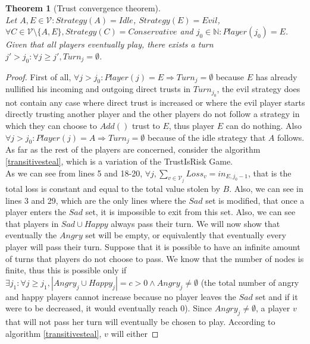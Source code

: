 \documentclass[11pt]{article}
\newtheorem{theorem}{Theorem}[section]
\theoremstyle{definition}
\theoremstyle{corollary}
\theoremstyle{lemma}
\begin{document}
    \begin{theorem}[Trust convergence theorem] \ \\
    \label{convergence}
       Let $A,E \in \mathcal{V} : Strategy(A) = Idle$, $Strategy(E) = Evil$, $\forall C \in \mathcal{V} \setminus \{A,E\},
       Strategy(C) = Conservative$ and $j_0 \in \mathbb{N} : Player(j_0) = E$. Given that all players eventually play, there
       exists a turn $j' > j_0 : \forall j \geq j', Turn_j = \emptyset$.
    \end{theorem}
    \begin{proof}
       First of all, $\forall j > j_0 : Player(j) = E \Rightarrow Turn_j = \emptyset$ because $E$ has already nullified his
       incoming and outgoing direct trusts in $Turn_{j_0}$, the evil strategy does not contain any case where direct trust is
       increased or where the evil player starts directly trusting another player and the other players do not follow a
       strategy in which they can choose to $Add()$ trust to $E$, thus player $E$ can do nothing. Also $\forall j > j_0 :
       Player(j) = A \Rightarrow Turn_j = \emptyset$ because of the idle strategy that $A$ follows. As far as the
       rest of the players are concerned, consider the algorithm \ref{transitivesteal}, which is a variation of the
       TrustIsRisk Game. \\
       As we can see from lines 5 and 18-20, $\forall j, \sum\limits_{v \in \mathcal{V}_j}Loss_v = in_{E, j_0-1}$, that is
       the total loss is constant and equal to the total value stolen by $B$. Also, we can see in lines 3 and 29, which are
       the only lines where the $Sad$ set is modified, that once a player enters the $Sad$ set, it is impossible to exit from
       this set. Also, we can see that players in $Sad \cup Happy$ always pass their turn. We will now show that eventually
       the $Angry$ set will be empty, or equivalently that eventually every player will pass their turn. Suppose that it is
       possible to have an infinite amount of turns that players do not choose to pass. We know that the number of nodes is
       finite, thus this is possible only if $\exists j_1: \forall j \geq j_1, |Angry_j \cup Happy_j| = c > 0 \wedge Angry_j
       \neq \emptyset$ (the total number of angry and happy players cannot increase because no player leaves the $Sad$ set
       and if it were to be decreased, it would eventually reach 0). Since $Angry_j \neq \emptyset$, a player $v$ that will
       not pass her turn will eventually be chosen to play. According to algorithm \ref{transitivesteal}, $v$ will either

\end{proof}
\end{document}
